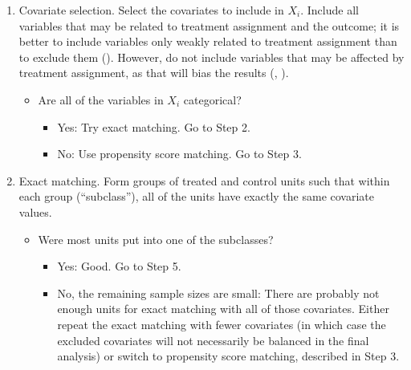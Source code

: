 \documentclass[11pt,titlepage]{article}
\begin{document}
\begin{enumerate}
\item Covariate selection.  Select the covariates to include in $X_i$.
  Include all variables that may be related to treatment assignment
  and the outcome; it is better to include variables only weakly
  related to treatment assignment than to exclude them
  (\cite{RubTho96, Heckman98a}).  However, do not include variables
  that may be affected by treatment assignment, as that will bias the
  results (\cite{FraRub02}, \cite{Greenland03}).
\begin{itemize} 
\item Are all of the variables in $X_i$ categorical?
  \begin{itemize} \item Yes: Try exact matching.  Go to Step 2.
  \item No: Use propensity score matching.  Go to Step 3.
  \end{itemize}
\end{itemize}

\item Exact matching.  Form groups of treated and control units such
  that within each group (``subclass''), all of the units have exactly
  the same covariate values.
\begin{itemize} 
\item Were most units put into one of the subclasses?
  \begin{itemize} \item Yes: Good.  Go to Step 5.
  \item No, the remaining sample sizes are small: There are probably
    not enough units for exact matching with all of those covariates.
    Either repeat the exact matching with fewer covariates (in which
    case the excluded covariates will not necessarily be balanced in
    the final analysis) or switch to propensity score matching,
    described in Step 3.
  \end{itemize}
\end{itemize}


\end{enumerate}
\end{document}
